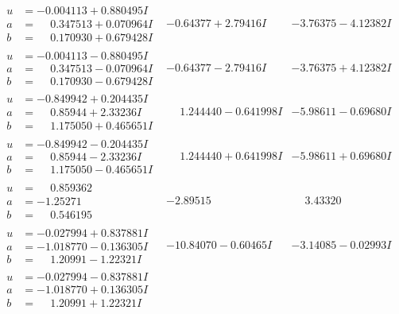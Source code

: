 \documentclass[1p]{elsarticle_modified}
\theoremstyle{definition}
\begin{document}
$$\begin{array}{c|c|c}
\begin{aligned}
u &= -0.004113 + 0.880495 I \\
a &= \phantom{-}0.347513 + 0.070964 I \\
b &= \phantom{-}0.170930 + 0.679428 I\end{aligned}
 & -0.64377 + 2.79416 I & -3.76375 - 4.12382 I \\ \hline\begin{aligned}
u &= -0.004113 - 0.880495 I \\
a &= \phantom{-}0.347513 - 0.070964 I \\
b &= \phantom{-}0.170930 - 0.679428 I\end{aligned}
 & -0.64377 - 2.79416 I & -3.76375 + 4.12382 I \\ \hline\begin{aligned}
u &= -0.849942 + 0.204435 I \\
a &= \phantom{-}0.85944 + 2.33236 I \\
b &= \phantom{-}1.175050 + 0.465651 I\end{aligned}
 & \phantom{-}1.244440 - 0.641998 I & -5.98611 - 0.69680 I \\ \hline\begin{aligned}
u &= -0.849942 - 0.204435 I \\
a &= \phantom{-}0.85944 - 2.33236 I \\
b &= \phantom{-}1.175050 - 0.465651 I\end{aligned}
 & \phantom{-}1.244440 + 0.641998 I & -5.98611 + 0.69680 I \\ \hline\begin{aligned}
u &= \phantom{-}0.859362\phantom{ +0.000000I} \\
a &= -1.25271\phantom{ +0.000000I} \\
b &= \phantom{-}0.546195\phantom{ +0.000000I}\end{aligned}
 & -2.89515\phantom{ +0.000000I} & \phantom{-}3.43320\phantom{ +0.000000I} \\ \hline\begin{aligned}
u &= -0.027994 + 0.837881 I \\
a &= -1.018770 - 0.136305 I \\
b &= \phantom{-}1.20991 - 1.22321 I\end{aligned}
 & -10.84070 - 0.60465 I & -3.14085 - 0.02993 I \\ \hline\begin{aligned}
u &= -0.027994 - 0.837881 I \\
a &= -1.018770 + 0.136305 I \\
b &= \phantom{-}1.20991 + 1.22321 I\end{aligned}

\end{array}$$
\end{document}
